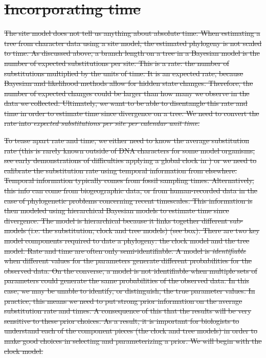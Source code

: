 \section{\sout{Incorporating time}}


\sout{The site model does not tell us anything about absolute time.
When estimating a tree from character data using a site model, the estimated phylogeny is not scaled to time.
As discussed above, a branch length on a tree in a Bayesian model is the number of expected substitutions per site.
This is a rate: the number of substitutions multiplied by the units of time.
It is an expected rate, because Bayesian and likelihood methods allow for hidden state changes.
Therefore, the number of expected changes could be larger than how many we observe in the data we collected.
Ultimately, we want to be able to disentangle this rate and time in order to estimate time since divergence on a tree.
We need to convert the rate into \textit{expected substitutions per site per calendar unit time}.}


\sout{To tease apart rate and time, we either need to know the average substitution rate (this is rarely known outside  of DNA characters for some model organisms, see early demonstrations of difficulties applying a global clock in \cite{gaut1992, MOOERS1994, bromham1996, rambaut1998}) or we need to calibrate the substitution rate using temporal information from elsewhere.
Temporal information typically comes from  fossil sampling times.
Alternatively, this info can come from biogeographic data, or from human-recorded data in the case of phylogenetic problems concerning recent timescales.
This information is then modeled using hierarchical  Bayesian models to estimate time since divergence.
The model is hierarchical because it links together different sub-models (i.e. the substitution, clock and tree models) (see box).
There are two key model components required to date a phylogeny: the clock model and the tree model.
Rate and time are often only semi-identifiable.
A model is \textit{identifiable} when different values for the parameters generate different probabilities for the observed data.
On the converse, a model is not identifiable when multiple sets of parameters could generate the same probabilities of the observed data.
In this case, we may be unable to identify, or distinguish, the true parameter values.
In practice, this means we need to put strong prior information on the average substitution rate and times. 
A consequence of this that the results will be very sensitive to these prior choices.
As a result, it is important for biologists to understand each of the component pieces (the clock and tree models) in order to make good choices in selecting and parameterizing a prior.
We will begin with the clock model.}





